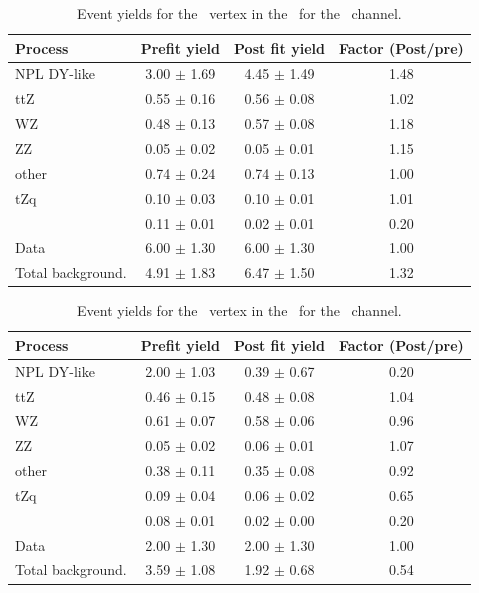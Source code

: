 \begin{table}[htbp]
	\centering
	\caption{Event yields for the \Zut\ vertex in the \TTCR\  for the \eemu\ channel. }
	\begin{tabular} {l c c c }
		\toprule
		Process & Prefit yield & Post fit yield & Factor (Post/pre) \\
		\midrule
		NPL DY-like & 3.00 $ \pm $ 1.69 & 4.45 $ \pm $ 1.49 & 1.48 \\ 
		ttZ & 0.55 $ \pm $ 0.16 & 0.56 $ \pm $ 0.08 & 1.02 \\ 
		WZ & 0.48 $ \pm $ 0.13 & 0.57 $ \pm $ 0.08 & 1.18 \\ 
		ZZ & 0.05 $ \pm $ 0.02 & 0.05 $ \pm $ 0.01 & 1.15 \\ 
		other & 0.74 $ \pm $ 0.24 & 0.74 $ \pm $ 0.13 & 1.00 \\ 
		tZq & 0.10 $ \pm $ 0.03 & 0.10 $ \pm $ 0.01 & 1.01 \\ 
		\kZut  & 0.11 $ \pm $ 0.01 & 0.02 $ \pm $ 0.01 & 0.20\\
		\hdashline
		Data & 6.00 $ \pm $ 1.30 & 6.00 $ \pm $ 1.30 & 1.00\\
		Total background. & 4.91 $ \pm $ 1.83 & 6.47 $ \pm $ 1.50 & 1.32\\
		\bottomrule
	\end{tabular}
\end{table}
\begin{table}[htbp]
	\centering
	\caption{Event yields for the \Zut\ vertex in the \TTCR\  for the \eee\ channel. }
	\begin{tabular} {l c c c }
		\toprule
		Process & Prefit yield & Post fit yield & Factor (Post/pre) \\
		\midrule
		NPL DY-like & 2.00 $ \pm $ 1.03 & 0.39 $ \pm $ 0.67 & 0.20 \\ 
		ttZ & 0.46 $ \pm $ 0.15 & 0.48 $ \pm $ 0.08 & 1.04 \\ 
		WZ & 0.61 $ \pm $ 0.07 & 0.58 $ \pm $ 0.06 & 0.96 \\ 
		ZZ & 0.05 $ \pm $ 0.02 & 0.06 $ \pm $ 0.01 & 1.07 \\ 
		other & 0.38 $ \pm $ 0.11 & 0.35 $ \pm $ 0.08 & 0.92 \\ 
		tZq & 0.09 $ \pm $ 0.04 & 0.06 $ \pm $ 0.02 & 0.65 \\ 
		\kZut  & 0.08 $ \pm $ 0.01 & 0.02 $ \pm $ 0.00 & 0.20\\
		\hdashline
		Data & 2.00 $ \pm $ 1.30 & 2.00 $ \pm $ 1.30 & 1.00\\
		Total background. & 3.59 $ \pm $ 1.08 & 1.92 $ \pm $ 0.68 & 0.54\\
		\bottomrule
	\end{tabular}
\end{table}
